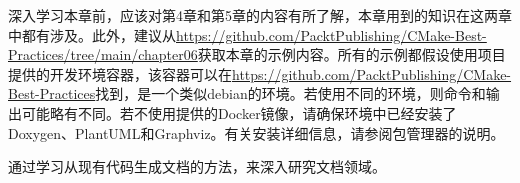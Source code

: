 深入学习本章前，应该对第4章和第5章的内容有所了解，本章用到的知识在这两章中都有涉及。此外，建议从\url{https://github.com/PacktPublishing/CMake-Best-Practices/tree/main/chapter06}获取本章的示例内容。所有的示例都假设使用项目提供的开发环境容器，该容器可以在\url{https://github.com/PacktPublishing/CMake-Best-Practices}找到，是一个类似debian的环境。若使用不同的环境，则命令和输出可能略有不同。若不使用提供的Docker镜像，请确保环境中已经安装了Doxygen、PlantUML和Graphviz。有关安装详细信息，请参阅包管理器的说明。

通过学习从现有代码生成文档的方法，来深入研究文档领域。